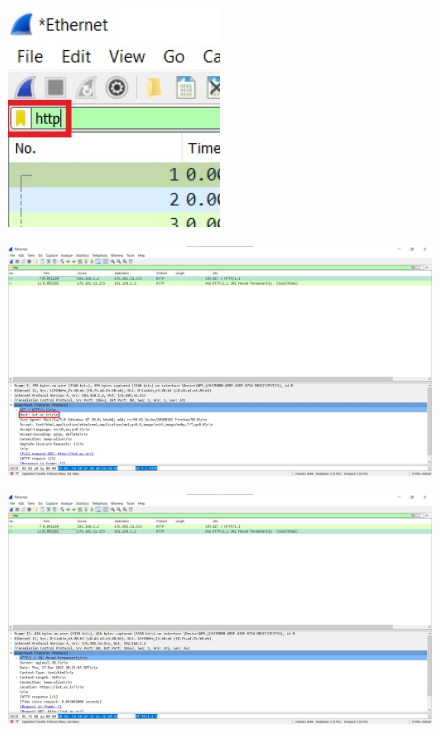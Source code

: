 \documentclass{article}
\begin{document}
\subsection{}
\begin{figure}[H]
    \centering
    \includegraphics[width=0.5\textwidth]{figures/11.jpg}
    \caption{}
    \label{fig:fig1}
\end{figure}
\begin{figure}[H]
    \centering
    \includegraphics[width=1.0\textwidth]{figures/12.jpg}
    \caption{}
    \label{fig:fig1}
\end{figure}
\begin{figure}[H]
    \centering
    \includegraphics[width=1.0\textwidth]{figures/13.jpg}
    \caption{}
    \label{fig:fig1}
\end{figure}
\end{document}
